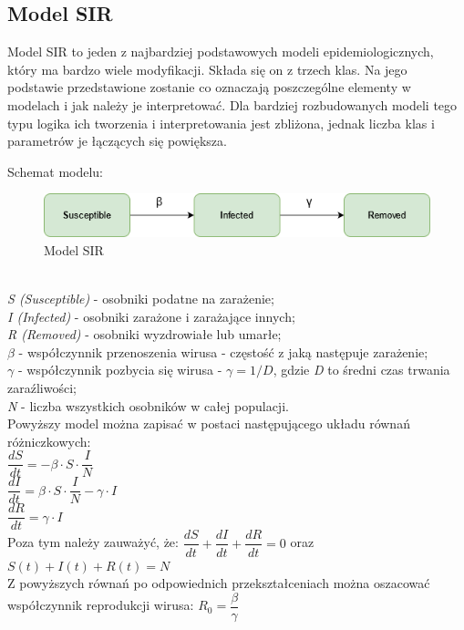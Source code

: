 \documentclass[12pt,a4paper]{article}
\begin{document}
\subsection{Model SIR}
Model SIR to jeden z najbardziej podstawowych modeli epidemiologicznych, który ma bardzo wiele modyfikacji. Składa się on z trzech klas. Na jego podstawie przedstawione zostanie co oznaczają poszczególne elementy w modelach i jak należy je interpretować. Dla bardziej rozbudowanych modeli tego typu logika ich tworzenia i interpretowania jest zbliżona, jednak liczba klas i parametrów je łączących się powiększa. 

Schemat modelu:
\begin{figure}[h!]
\centering
\includegraphics[width=1.0\textwidth]{Schematy/SIR}
\caption{Model SIR} 
\label{fig:Model SIR}
\end{figure}\\
\textit{S (Susceptible)} - osobniki podatne na zarażenie;\\
\textit{I (Infected)} - osobniki zarażone i zarażające innych;\\
\textit{R (Removed)} - osobniki wyzdrowiałe lub umarłe;\\
\textit{$\beta$} - współczynnik przenoszenia wirusa - częstość z jaką następuje zarażenie;\\
\textit{$\gamma$} - współczynnik pozbycia się wirusa - $\gamma = 1/D$, gdzie \textit{D} to średni czas trwania zaraźliwości;\\
\textit{N} - liczba wszystkich osobników w całej populacji.\\
Powyższy model można zapisać w postaci następującego układu równań różniczkowych:\\
$\dfrac{dS}{dt} = -\beta\cdot{S}\cdot\dfrac{I}{N}$\\
$\dfrac{dI}{dt} = \beta\cdot{S}\cdot\dfrac{I}{N} - \gamma\cdot{I}$\\
$\dfrac{dR}{dt} = \gamma\cdot{I}$\\
Poza tym należy zauważyć, że:
$\dfrac{dS}{dt} + \dfrac{dI}{dt} + \dfrac{dR}{dt} = 0$ oraz $S(t) + I(t) + R(t) = N$\\
Z powyższych równań po odpowiednich przekształceniach można oszacować współczynnik reprodukcji wirusa:
$ R_0  = \dfrac{\beta}{\gamma}$\\\\
\end{document}
